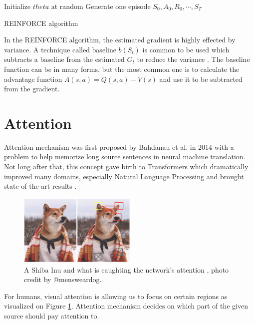         \begin{algorithm}[H]
        \SetAlgoLined
         Initialize $theta$ at random\;
         Generate one episode $S_0, A_0, R_0, \cdots, S_T$\;
         \caption{REINFORCE algorithm}
        \end{algorithm}
        
        In the REINFORCE algorithm, the estimated gradient is highly effected by variance. A technique called baseline $b(S_t)$ is common to be used which subtracts a baseline from the estimated $G_t$ to reduce the variance \cite{baseline-artical}. The baseline function can be in many forms, but the most common one is to calculate the advantage function $A(s, a) = Q(s, a) - V(s)$ and use it to be subtracted from the gradient.

    \section{Attention}\label{attention}
    Attention mechanism was first proposed by Bahdanau et al.\cite{first-attention} in 2014 with a problem to help memorize long source sentences in neural machine translation. Not long after that, this concept gave birth to Transformers which dramatically improved many domains, especially Natural Language Processing and brought state-of-the-art results \cite{gpt-2}.
    
    \begin{figure}[ht]
        \centering
        \includegraphics[width=0.5\textwidth]{resources/theoretical-background/shiba-attention.png}
        \caption{A Shiba Inu and what is caughting the network's attention \cite{attention-weng}, photo credit by @mensweardog.}
        \label{fig:shiba}
    \end{figure}
    
    For humans, visual attention is allowing us to focus on certain regions as visualized on Figure \ref{fig:shiba}. Attention mechanism decides on which part of the given source should pay attention to. 

